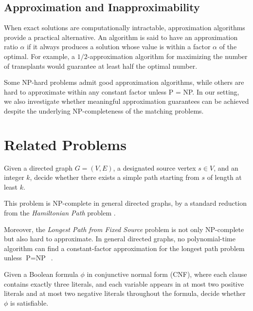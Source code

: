 \subsection*{Approximation and Inapproximability}

When exact solutions are computationally intractable, approximation algorithms provide a practical alternative. An algorithm is said to have an approximation ratio $\alpha$ if it always produces a solution whose value is within a factor $\alpha$ of the optimal. For example, a $1/2$-approximation algorithm for maximizing the number of transplants would guarantee at least half the optimal number.

Some NP-hard problems admit good approximation algorithms, while others are hard to approximate within any constant factor unless P = NP. In our setting, we also investigate whether meaningful approximation guarantees can be achieved despite the underlying NP-completeness of the matching problems.


\section{Related Problems}

\begin{problem}
\label{prob:longest_simple_path}
Given a directed graph $G = (V, E)$, a designated source vertex $s \in V$, and an integer $k$, decide whether there exists a simple path starting from $s$ of length at least $k$.
\end{problem}

This problem is NP-complete in general directed graphs, by a standard reduction from the \textit{Hamiltonian Path} problem \cite{garey1979computers}.

Moreover, the \textit{Longest Path from Fixed Source} problem is not only NP-complete but also hard to approximate. In general directed graphs, no polynomial-time algorithm can find a constant-factor approximation for the longest path problem unless $\text{P} = \text{NP}$~\cite{karger1997approximating}. 

\begin{problem}[2P2N-3SAT]
\label{prob:2p2n_3sat}
Given a Boolean formula $\phi$ in conjunctive normal form (CNF), where each clause contains exactly three literals, and each variable appears in at most two positive literals and at most two negative literals throughout the formula, decide whether $\phi$ is satisfiable.
\end{problem}

